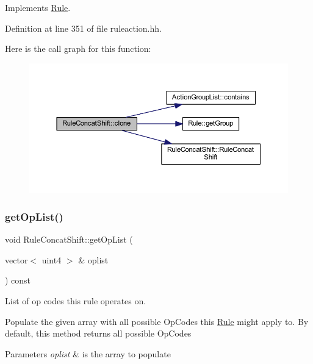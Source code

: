 Implements \mbox{\hyperlink{class_rule_a70de90a76461bfa7ea0b575ce3c11e4d}{Rule}}.



Definition at line 351 of file ruleaction.\+hh.

Here is the call graph for this function\+:
\nopagebreak
\begin{figure}[H]
\begin{center}
\leavevmode
\includegraphics[width=350pt]{class_rule_concat_shift_a61c36a17ec824709364df8a3fa9f8ce8_cgraph}
\end{center}
\end{figure}
\mbox{\label{class_rule_concat_shift_aed8199aa900381abf4df2e9ad708217b}} 
\subsubsection{\texorpdfstring{getOpList()}{getOpList()}}
{\footnotesize\ttfamily void Rule\+Concat\+Shift\+::get\+Op\+List (\begin{DoxyParamCaption}\item[{vector$<$ uint4 $>$ \&}]{oplist }\end{DoxyParamCaption}) const\hspace{0.3cm}{\ttfamily [virtual]}}



List of op codes this rule operates on. 

Populate the given array with all possible Op\+Codes this \mbox{\hyperlink{class_rule}{Rule}} might apply to. By default, this method returns all possible Op\+Codes 
\begin{DoxyParams}{Parameters}
{\em oplist} & is the array to populate \\
\hline
\end{DoxyParams}


